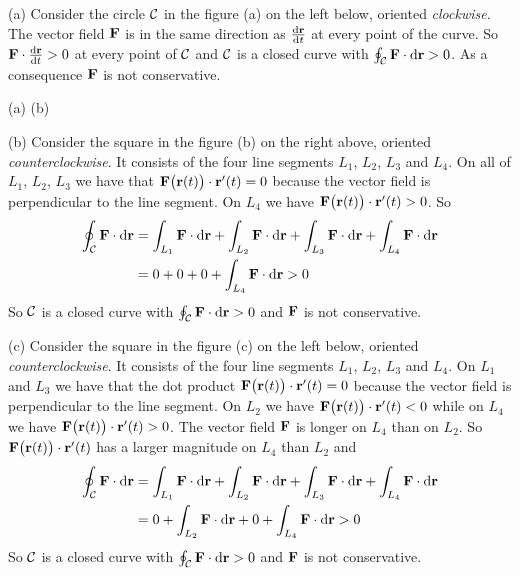 \begin{solution} 
(a) Consider the circle $\mathcal{C}$ in the figure (a) on the left below,
oriented {\it clockwise}. The vector field $\mathbf{F}$ is in the same
direction as $\diff{\vr}{t}$ at every point of the curve. 
So $\vF\cdot\diff{\vr}{t}>0$ at every point of $\mathcal{C}$ and
$\mathcal{C}$ is a closed curve with $\oint_{\mathcal{C}}\mathbf{F}\cdot \mathrm{d}\mathbf{r}>0$.
As a consequence  $\mathbf{F}$ is not conservative. 
\begin{center}
      (a) \qquad
      (b) \qquad
\end{center}
\smallskip
(b) Consider the square in the figure (b) on the right above,
oriented {\it counterclockwise}. It consists of the four line
segments $L_1$, $L_2$, $L_3$ and $L_4$. On all of $L_1$, $L_2$, $L_3$
we have that $\mathbf{F}\big(\mathbf{r}(t)\big)\cdot\mathbf{r}'(t)=0$ because the vector
field is perpendicular to the line segment. On  $L_4$
we have $\mathbf{F}\big(\mathbf{r}(t)\big)\cdot\mathbf{r}'(t)>0$. So
\begin{align*}
\oint_{\mathcal{C}}\mathbf{F}\cdot \mathrm{d}\mathbf{r} &= \int_{L_1}\mathbf{F}\cdot \mathrm{d}\mathbf{r}
                         +\int_{L_2}\mathbf{F}\cdot \mathrm{d}\mathbf{r}
                         +\int_{L_3}\mathbf{F}\cdot \mathrm{d}\mathbf{r}
                         +\int_{L_4}\mathbf{F}\cdot \mathrm{d}\mathbf{r} \\
                         & =0+0+0+\int_{L_4}\mathbf{F}\cdot \mathrm{d}\mathbf{r}>0
\end{align*}
So $\mathcal{C}$ is a closed curve with $\oint_{\mathcal{C}}\mathbf{F}\cdot \mathrm{d}\mathbf{r}>0$
and  $\mathbf{F}$ is not conservative.


(c) Consider the square in the figure (c) on the left below,
oriented {\it counterclockwise}. It consists of the four line
segments $L_1$, $L_2$, $L_3$ and $L_4$. On $L_1$ and $L_3$
we have that the dot product $\mathbf{F}\big(\mathbf{r}(t)\big)\cdot\mathbf{r}'(t)=0$ because the vector
field is perpendicular to the line segment. On  $L_2$
we have $\mathbf{F}\big(\mathbf{r}(t)\big)\cdot\mathbf{r}'(t)<0$ while on  $L_4$
we have $\mathbf{F}\big(\mathbf{r}(t)\big)\cdot\mathbf{r}'(t)>0$. The vector field
$\mathbf{F}$ is longer on $L_4$ than on $L_2$. So 
$\mathbf{F}\big(\mathbf{r}(t)\big)\cdot\mathbf{r}'(t)$ has a larger magnitude on $L_4$
than $L_2$ and
\begin{align*}
\oint_{\mathcal{C}}\mathbf{F}\cdot \mathrm{d}\mathbf{r} &= \int_{L_1}\mathbf{F}\cdot \mathrm{d}\mathbf{r}
                         +\int_{L_2}\mathbf{F}\cdot \mathrm{d}\mathbf{r}
                         +\int_{L_3}\mathbf{F}\cdot \mathrm{d}\mathbf{r}
                         +\int_{L_4}\mathbf{F}\cdot \mathrm{d}\mathbf{r} \\
                         & =0+\int_{L_2}\mathbf{F}\cdot \mathrm{d}\mathbf{r}+0
                           +\int_{L_4}\mathbf{F}\cdot \mathrm{d}\mathbf{r}>0
\end{align*}
So $\mathcal{C}$ is a closed curve with $\oint_{\mathcal{C}}\mathbf{F}\cdot \mathrm{d}\mathbf{r}>0$
and  $\mathbf{F}$ is not conservative.


\end{solution}
